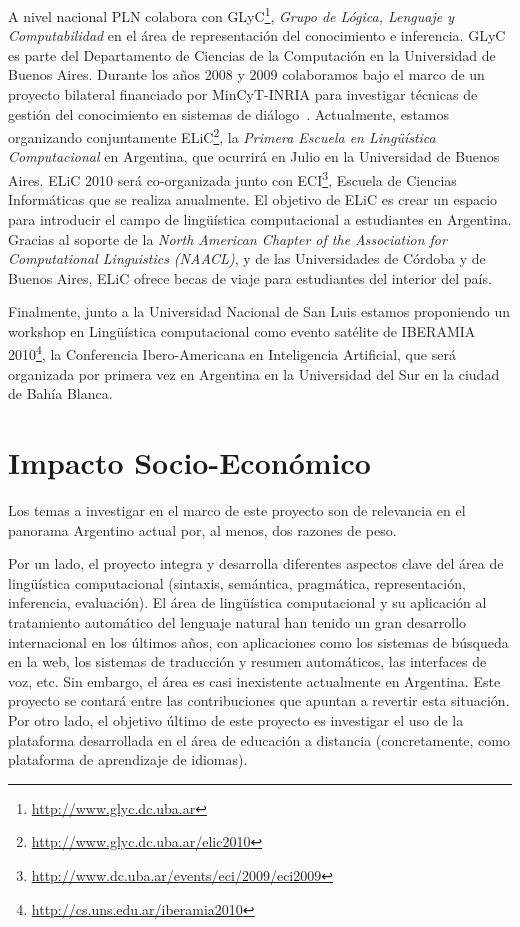 \documentclass[11pt]{article}
\begin{document}
A nivel nacional PLN colabora con
GLyC\footnote{\url{http://www.glyc.dc.uba.ar}}, \emph{Grupo de L\'ogica,
Lenguaje y Computabilidad} en el \'area de representaci\'on del conocimiento e
inferencia. GLyC es parte del Departamento de Ciencias de la Computaci\'on en
la Universidad de Buenos Aires. Durante los a\~nos 2008 y 2009 colaboramos bajo
el marco de un proyecto bilateral financiado por MinCyT-INRIA para investigar
t\'ecnicas de gesti\'on del conocimiento en sistemas de
di\'alogo~\cite{benotti10b}. Actualmente, estamos organizando conjuntamente
ELiC\footnote{\url{http://www.glyc.dc.uba.ar/elic2010}}, 
la \emph{Primera Escuela en Ling\"u\'istica Computacional} en Argentina, que
ocurrir\'a en Julio en la Universidad de Buenos Aires.  ELiC 2010 ser\'a
co-organizada junto con 
ECI\footnote{\url{http://www.dc.uba.ar/events/eci/2009/eci2009}},
Escuela de Ciencias Inform\'aticas que se realiza anualmente. 
El objetivo de ELiC es crear un espacio para introducir el
campo de ling\"u\'istica computacional a estudiantes en Argentina. Gracias al
soporte de la \emph{North American Chapter of the Association for
Computational Linguistics (NAACL)}, y de las Universidades de C\'ordoba y de
Buenos Aires, ELiC ofrece becas de viaje para estudiantes del interior del
pa\'is.

Finalmente, junto a la Universidad Nacional de San Luis estamos proponiendo un
workshop en Ling\"u\'istica computacional como evento sat\'elite de IBERAMIA
2010\footnote{\url{http://cs.uns.edu.ar/iberamia2010}}, 
la Conferencia Ibero-Americana en Inteligencia Artificial, que ser\'a
organizada por primera vez en Argentina en la Universidad del Sur
en la ciudad de Bah\'ia Blanca.            


\section{Impacto Socio-Econ\'omico} \label{economico}

Los temas a investigar en el marco de este proyecto son de relevancia en el
panorama Argentino actual por, al menos, dos razones de peso.

Por un lado, el proyecto
integra y desarrolla diferentes aspectos clave del \'area de ling\"u\'istica
computacional (sintaxis, sem\'antica, pragm\'atica, representaci\'on,
inferencia, evaluaci\'on). El \'area de ling\"u\'istica computacional y su
aplicaci\'on al tratamiento autom\'atico del lenguaje natural han tenido un
gran desarrollo internacional en los \'ultimos a\~nos, con aplicaciones como los
sistemas de b\'usqueda en la web, los sistemas de traducci\'on y resumen
autom\'aticos, las interfaces de voz, etc. Sin embargo, el \'area es casi
inexistente actualmente en Argentina. Este proyecto se contar\'a entre 
las contribuciones que apuntan a revertir esta situaci\'on.
Por otro lado, el objetivo \'ultimo de este proyecto es investigar el uso de la
plataforma
desarrollada en el \'area de educaci\'on a distancia (concretamente, como
plataforma de aprendizaje de idiomas).
\end{document}
